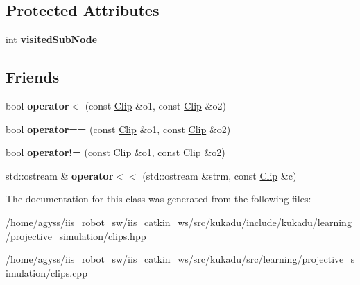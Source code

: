 \subsection*{Protected Attributes}
\begin{DoxyCompactItemize}
\item 
int {\bfseries visited\+Sub\+Node}\hypertarget{classkukadu_1_1Clip_a17bb4754cdf923cc3b3c9bc344ec9452}{}\label{classkukadu_1_1Clip_a17bb4754cdf923cc3b3c9bc344ec9452}

\end{DoxyCompactItemize}
\subsection*{Friends}
\begin{DoxyCompactItemize}
\item 
bool {\bfseries operator$<$} (const \hyperlink{classkukadu_1_1Clip}{Clip} \&o1, const \hyperlink{classkukadu_1_1Clip}{Clip} \&o2)\hypertarget{classkukadu_1_1Clip_afa49def0694b1872fe61d573e16d05b5}{}\label{classkukadu_1_1Clip_afa49def0694b1872fe61d573e16d05b5}

\item 
bool {\bfseries operator==} (const \hyperlink{classkukadu_1_1Clip}{Clip} \&o1, const \hyperlink{classkukadu_1_1Clip}{Clip} \&o2)\hypertarget{classkukadu_1_1Clip_a72090efb6ab8a7595cab10f6d925abd4}{}\label{classkukadu_1_1Clip_a72090efb6ab8a7595cab10f6d925abd4}

\item 
bool {\bfseries operator!=} (const \hyperlink{classkukadu_1_1Clip}{Clip} \&o1, const \hyperlink{classkukadu_1_1Clip}{Clip} \&o2)\hypertarget{classkukadu_1_1Clip_a6e577ddd795af4bf2cfe74ea14c3b7bc}{}\label{classkukadu_1_1Clip_a6e577ddd795af4bf2cfe74ea14c3b7bc}

\item 
std\+::ostream \& {\bfseries operator$<$$<$} (std\+::ostream \&strm, const \hyperlink{classkukadu_1_1Clip}{Clip} \&c)\hypertarget{classkukadu_1_1Clip_a01b9c25753a11dcefcbfc0827f876444}{}\label{classkukadu_1_1Clip_a01b9c25753a11dcefcbfc0827f876444}

\end{DoxyCompactItemize}


The documentation for this class was generated from the following files\+:\begin{DoxyCompactItemize}
\item 
/home/agyss/iis\+\_\+robot\+\_\+sw/iis\+\_\+catkin\+\_\+ws/src/kukadu/include/kukadu/learning/projective\+\_\+simulation/clips.\+hpp\item 
/home/agyss/iis\+\_\+robot\+\_\+sw/iis\+\_\+catkin\+\_\+ws/src/kukadu/src/learning/projective\+\_\+simulation/clips.\+cpp\end{DoxyCompactItemize}
